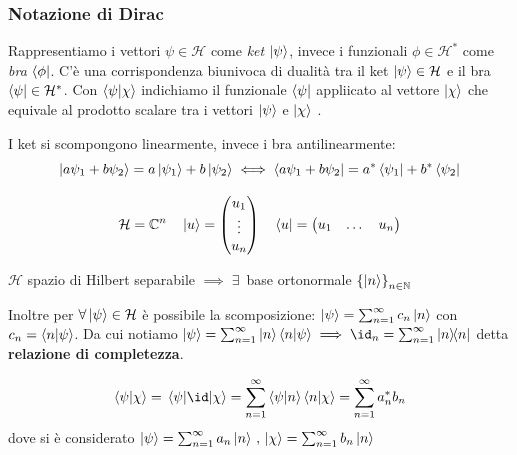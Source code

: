 \subsubsection{Notazione di Dirac}
Rappresentiamo i vettori \(\psi \in \mathcal{H}\) come \textit{ket} \(\ket{\psi}\), 
invece i funzionali \(\phi\in \mathcal{H}^*\) come \textit{bra} \(\bra{\phi}\).
C'è una corrispondenza biunivoca di dualità tra il ket \(\ket{\psi}\in \mathcal{H}\) e il bra \(\bra{\psi} \in \mathcal{H}^*\).
Con \(\braket{\psi}{\chi}\) indichiamo il funzionale \(\bra{\psi}\) appliicato al vettore \(\ket{\chi}\)
che equivale al prodotto scalare tra i vettori \(\ket{\psi}\) e \(\ket{\chi}\) .
\begin{attention}
    I ket si scompongono linearmente, invece i bra antilinearmente:
    \[
    \ket{a\psi_1+b\psi_2}= a\ket{\psi_1}+ b\ket{\psi_2} \iff \bra{a\psi_1+b\psi_2}= a^*\bra{\psi_1}+ b^* \bra{\psi_2}
    \]
\end{attention}

\begin{example}
    \[
    \mathcal{H}= \mathbb{C}^n   \quad \ket{u}= \begin{pmatrix}
        u_1\\\vdots \\ u_n  
    \end{pmatrix}
    \quad \bra{u}= \begin{pmatrix}
        u_1 & \dots & u_n
    \end{pmatrix}
    \]
\end{example}



\begin{theorem}
    \(\mathcal{H} \) spazio di Hilbert separabile \(\implies  \;\exists\,\) base ortonormale
    \(\left\{ \ket{n} \right\}_{n \in \mathbb{N}}\)
\end{theorem}
Inoltre per \(\forall \ket{\psi} \in \mathcal{H}\) è possibile la scomposizione:
\(\ket{\psi}= \sum_{n=1}^{\infty}c_n\ket{n}\) con \(c_n = \braket{n}{\psi}\).
Da cui notiamo \(\ket{\psi}= \sum_{n=1}^{\infty}\ket{n}\braket{n}{\psi} \implies \id_n= \sum_{n=1}^{\infty} \dyad{n}{n}\)
detta \textbf{relazione di completezza}.

\begin{example}
    \[
    \braket{\psi}{\chi}= \matrixel{\psi}{\id}{\chi}=
    \sum_{n=1}^{\infty} \braket{\psi}{n}\braket{n}{\chi}  = \sum_{n=1}^{\infty} a^*_n b_n
    \]
    dove si è considerato \(\ket{\psi}= \sum_{n=1}^{\infty}a_n \ket{n} \,, 
    \, \ket{\chi}= \sum_{n=1}^{\infty}b_n \ket{n}\)
\end{example}

